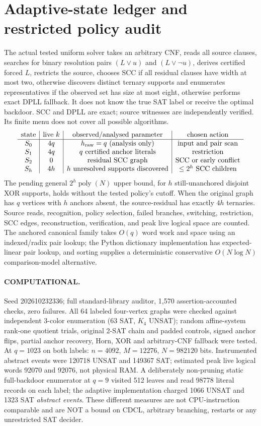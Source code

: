 \documentclass[11pt]{article}
\newcommand{\poly}{\operatorname{poly}}
\begin{document}
\section{Adaptive-state ledger and restricted policy audit}
The actual tested uniform solver takes an arbitrary CNF, reads all source clauses, searches for binary resolution pairs $(L\vee u)$ and $(L\vee\neg u)$, derives certified forced $L$, restricts the source, chooses SCC if all residual clauses have width at most two, otherwise discovers distinct ternary supports and enumerates representatives if the observed set has size at most eight, otherwise performs exact DPLL fallback. It does not know the true SAT label or receive the optimal backdoor. SCC and DPLL are exact; source witnesses are independently verified. Its finite menu does not cover all possible algorithms.
\[
\begin{array}{c|c|c|c}
\text{state}&\text{live }k&\text{observed/analysed parameter}&\text{chosen action}\\\hline
S_0&4q&h_{\rm raw}=q\text{ (analysis only)}&\text{input and pair scan}\\
S_1&4q&q\text{ certified anchor literals}&\text{restriction}\\
S_2&0&\text{residual SCC graph}&\text{SCC or early conflict}\\
S_h&4h&h\text{ unresolved supports discovered}&\le2^h\text{ SCC children}
\end{array}
\]
The pending general $2^h\poly(N)$ upper bound, for $h$ still-unanchored disjoint XOR supports, holds without the tested policy's cutoff. When the original graph has $q$ vertices with $h$ anchors absent, the source-residual has exactly $4h$ ternaries. Source reads, recognition, policy selection, failed branches, switching, restriction, SCC edges, reconstruction, verification, and peak live logical space are counted. The anchored canonical family takes $O(q)$ word work and space using an indexed/radix pair lookup; the Python dictionary implementation has expected-linear pair lookup, and sorting supplies a deterministic conservative $O(N\log N)$ comparison-model alternative.
\paragraph{COMPUTATIONAL.} Seed 202610232336; full standard-library auditor, 1,570 assertion-accounted checks, zero failures. All 64 labeled four-vertex graphs were checked against independent 3-color enumeration (63 SAT, $K_4$ UNSAT); random affine-system rank-one quotient trials, original 2-SAT chain and padded controls, signed anchor flips, partial anchor recovery, Horn, XOR and arbitrary-CNF fallback were tested. At $q=1023$ on both labels: $n=4092$, $M=12276$, $N=982120$ bits. Instrumented abstract events were 120718 UNSAT and 149367 SAT; estimated peak live logical words 92070 and 92076, not physical RAM. A deliberately non-pruning static full-backdoor enumerator at $q=9$ visited 512 leaves and read 98778 literal records on each label; the adaptive implementation charged 1066 UNSAT and 1323 SAT \emph{abstract events}. These different measures are not CPU-instruction comparable and are NOT a bound on CDCL, arbitrary branching, restarts or any unrestricted SAT decider.
\end{document}
